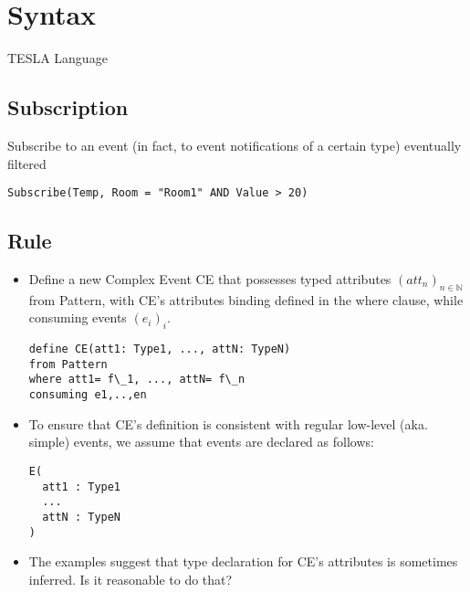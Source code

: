 \chapter{Syntax}
\label{sec:Syntax}

TESLA Language \cite{Cugola-Margara:2010}

\section{Subscription}
\label{sec:Subscription}

Subscribe to an event (in fact, to event notifications of a
certain type) eventually filtered

\begin{lstlisting}[language=iotdsl]
Subscribe(Temp, Room = "Room1" AND Value > 20)
\end{lstlisting}

\section{Rule}
\label{sec:Rule}

\begin{itemize}
	\item Define a new Complex Event \textsf{CE} that possesses typed attributes
			$(att_n)_{n\in\mathbb{N}}$ from \textsf{Pattern}, with \textsf{CE}'s attributes binding defined in the where clause, while consuming events $(e_i)_i$.

\begin{lstlisting}[language=iotdsl]
define CE(att1: Type1, ..., attN: TypeN)
from Pattern
where att1= f\_1, ..., attN= f\_n
consuming e1,..,en
\end{lstlisting}

	\item To ensure that CE's definition is consistent with regular low-level (aka.
			simple) events, we assume that events are declared as follows:

\begin{lstlisting}[language=iotdsl]
E(
  att1 : Type1
  ...
  attN : TypeN
)
\end{lstlisting}

	\item The examples suggest that type declaration for CE's attributes is sometimes inferred. Is it reasonable to do that?
\end{itemize}







